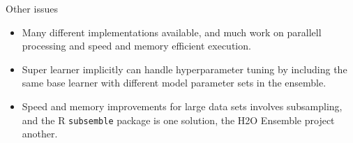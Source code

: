 \documentclass[
  ignorenonframetext,
]{beamer}
\providecommand{\tightlist}{%
  \setlength{\itemsep}{0pt}\setlength{\parskip}{0pt}}
\begin{document}
\begin{frame}[fragile]
\begin{block}{Other issues}
\protect\hypertarget{other-issues}{}
\begin{itemize}
\tightlist
\item
  Many different implementations available, and much work on parallell
  processing and speed and memory efficient execution.
\item
  Super learner implicitly can handle hyperparameter tuning by including
  the same base learner with different model parameter sets in the
  ensemble.
\item
  Speed and memory improvements for large data sets involves
  subsampling, and the R \texttt{subsemble} package is one solution, the
  H2O Ensemble project another.
\end{itemize}
\end{block}
\end{frame}
\end{document}
